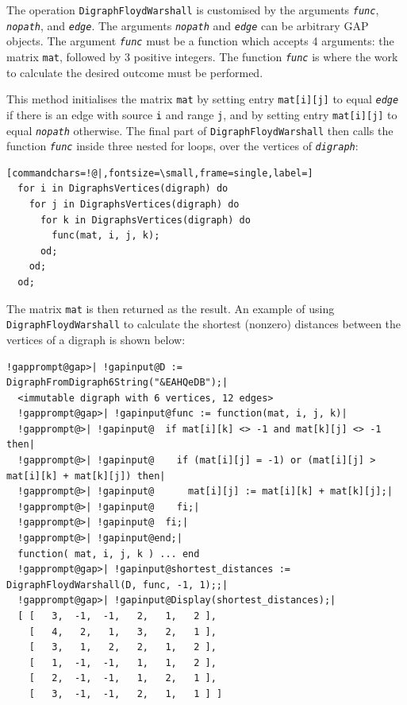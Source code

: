 \documentclass[a4paper,11pt]{report}
\begin{document}
{{{ The operation \texttt{DigraphFloydWarshall} is customised by the arguments \mbox{\texttt{\mdseries\slshape func}}, \mbox{\texttt{\mdseries\slshape nopath}}, and \mbox{\texttt{\mdseries\slshape edge}}. The arguments \mbox{\texttt{\mdseries\slshape nopath}} and \mbox{\texttt{\mdseries\slshape edge}} can be arbitrary \textsf{GAP} objects. The argument \mbox{\texttt{\mdseries\slshape func}} must be a function which accepts 4 arguments: the matrix \texttt{mat}, followed by 3 positive integers. The function \mbox{\texttt{\mdseries\slshape func}} is where the work to calculate the desired outcome must be performed. 

 This method initialises the matrix \texttt{mat} by setting entry \texttt{mat[i][j]} to equal \mbox{\texttt{\mdseries\slshape edge}} if there is an edge with source \texttt{i} and range \texttt{j}, and by setting entry \texttt{mat[i][j]} to equal \mbox{\texttt{\mdseries\slshape nopath}} otherwise. The final part of \texttt{DigraphFloydWarshall} then calls the function \mbox{\texttt{\mdseries\slshape func}} inside three nested for loops, over the vertices of \mbox{\texttt{\mdseries\slshape digraph}}: 

 
\begin{Verbatim}[commandchars=!@|,fontsize=\small,frame=single,label=]
  for i in DigraphsVertices(digraph) do
    for j in DigraphsVertices(digraph) do
      for k in DigraphsVertices(digraph) do
        func(mat, i, j, k);
      od;
    od;
  od;
\end{Verbatim}
 The matrix \texttt{mat} is then returned as the result. An example of using \texttt{DigraphFloydWarshall} to calculate the shortest (non\texttt{}zero) distances between the
vertices of a digraph is shown below: 

 
\begin{Verbatim}[commandchars=!@|,fontsize=\small,frame=single,label=Example]
  !gapprompt@gap>| !gapinput@D := DigraphFromDigraph6String("&EAHQeDB");|
  <immutable digraph with 6 vertices, 12 edges>
  !gapprompt@gap>| !gapinput@func := function(mat, i, j, k)|
  !gapprompt@>| !gapinput@  if mat[i][k] <> -1 and mat[k][j] <> -1 then|
  !gapprompt@>| !gapinput@    if (mat[i][j] = -1) or (mat[i][j] > mat[i][k] + mat[k][j]) then|
  !gapprompt@>| !gapinput@      mat[i][j] := mat[i][k] + mat[k][j];|
  !gapprompt@>| !gapinput@    fi;|
  !gapprompt@>| !gapinput@  fi;|
  !gapprompt@>| !gapinput@end;|
  function( mat, i, j, k ) ... end
  !gapprompt@gap>| !gapinput@shortest_distances := DigraphFloydWarshall(D, func, -1, 1);;|
  !gapprompt@gap>| !gapinput@Display(shortest_distances);|
  [ [   3,  -1,  -1,   2,   1,   2 ],
    [   4,   2,   1,   3,   2,   1 ],
    [   3,   1,   2,   2,   1,   2 ],
    [   1,  -1,  -1,   1,   1,   2 ],
    [   2,  -1,  -1,   1,   2,   1 ],
    [   3,  -1,  -1,   2,   1,   1 ] ]
\end{Verbatim}
 }

}}
\end{document}

